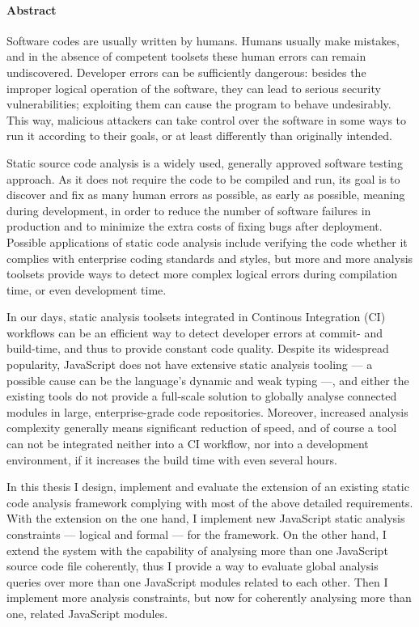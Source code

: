 \clearpage

\paragraph*{Abstract}
{}
\thispagestyle{plain}

	Software codes are usually written by humans. Humans usually make mistakes, and in the absence of competent toolsets these human errors can remain undiscovered. Developer errors can be sufficiently dangerous: besides the improper logical operation of the software, they can lead to serious security vulnerabilities; exploiting them can cause the program to behave undesirably. This way, malicious attackers can take control over the software in some ways to run it according to their goals, or at least differently than originally intended.

	Static source code analysis is a widely used, generally approved software testing approach. As it does not require the code to be compiled and run, its goal is to discover and fix as many human errors as possible, as early as possible, meaning during development, in order to reduce the number of software failures in production and to minimize the extra costs of fixing bugs after deployment. Possible applications of static code analysis include verifying the code whether it complies with enterprise coding standards and styles, but more and more analysis toolsets provide ways to detect more complex logical errors during compilation time, or even development time.

	In our days, static analysis toolsets integrated in Continous Integration (CI) workflows can be an efficient way to detect developer errors at commit- and build-time, and thus to provide constant code quality. Despite its widespread popularity, JavaScript does not have extensive static analysis tooling — a possible cause can be the language's dynamic and weak typing —, and either the existing tools do not provide a full-scale solution to globally analyse connected modules in large, enterprise-grade code repositories. Moreover, increased analysis complexity generally means significant reduction of speed, and of course a tool can not be integrated neither into a CI workflow, nor into a development environment, if it increases the build time with even several hours.

	In this thesis I design, implement and evaluate the extension of an existing static code analysis framework complying with most of the above detailed requirements. With the extension on the one hand, I implement new JavaScript static analysis constraints — logical and formal — for the framework. On the other hand, I extend the system with the capability of analysing more than one JavaScript source code file coherently, thus I provide a way to evaluate global analysis queries over more than one JavaScript modules related to each other. Then I implement more analysis constraints, but now for coherently analysing more than one, related JavaScript modules.

